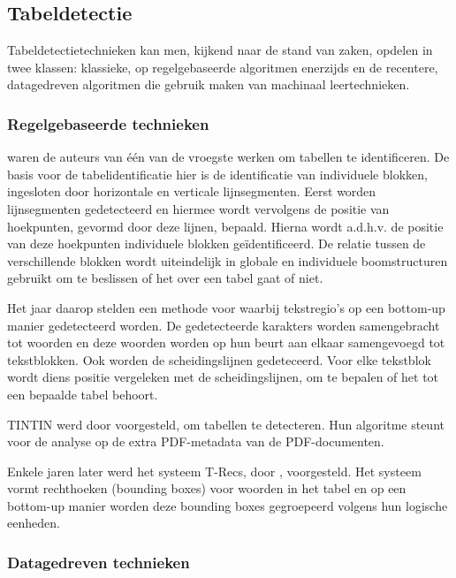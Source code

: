 \subsection{Tabeldetectie}
\label{subsec:tabel-detectie}

Tabeldetectietechnieken kan men, kijkend naar de stand van zaken, opdelen in twee klassen: klassieke, op regelgebaseerde algoritmen enerzijds en de recentere, datagedreven algoritmen die gebruik maken van machinaal leertechnieken.

\subsubsection{Regelgebaseerde technieken}

\textcite{Watanabe1991} waren de auteurs van één van de vroegste werken om tabellen te identificeren. De basis voor de tabelidentificatie hier is de identificatie van individuele blokken, ingesloten door horizontale en verticale lijnsegmenten. Eerst worden lijnsegmenten gedetecteerd en hiermee wordt vervolgens de positie van hoekpunten, gevormd door deze lijnen, bepaald. Hierna wordt a.d.h.v. de positie van deze hoekpunten individuele blokken geïdentificeerd. De relatie tussen de verschillende blokken wordt uiteindelijk in globale en individuele boomstructuren gebruikt om te beslissen of het over een tabel gaat of niet.

Het jaar daarop stelden \textcite{Laurentini1992} een methode voor waarbij tekstregio's op een bottom-up manier gedetecteerd worden. De gedetecteerde karakters worden samengebracht tot woorden en deze woorden worden op hun beurt aan elkaar samengevoegd tot tekstblokken. Ook worden de scheidingslijnen gedeteceerd. Voor elke tekstblok wordt diens positie vergeleken met de scheidingslijnen, om te bepalen of het tot een bepaalde tabel behoort.

TINTIN werd door \textcite{Pyreddy1997} voorgesteld, om tabellen te detecteren. Hun algoritme steunt voor de analyse op de extra PDF-metadata van de PDF-documenten.

Enkele jaren later werd het systeem T-Recs, door \textcite{Kieninger2001}, voorgesteld. Het systeem vormt rechthoeken (bounding boxes) voor woorden in het tabel en op een bottom-up manier worden deze bounding boxes gegroepeerd volgens hun logische eenheden. 

\subsubsection{Datagedreven technieken}

